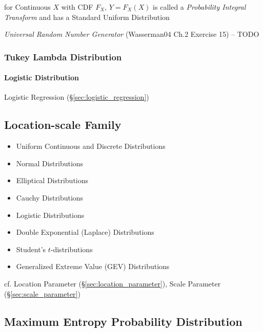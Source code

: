 for Continuous $X$ with CDF $F_X$, $Y = F_X(X)$ is called a \emph{Probability
  Integral Transform} and has a Standard Uniform Distribution

\emph{Universal Random Number Generator} (Wasserman04 Ch.2 Exercise 15) -- TODO



\subsubsection{Tukey Lambda Distribution}\label{sec:tukey_lambda_distribution}

\paragraph{Logistic Distribution}\label{sec:logistic_distribution}\hfill

\fist Logistic Regression (\S\ref{sec:logistic_regression})



\subsection{Location-scale Family}\label{sec:location_scale}

\begin{itemize}
  \item Uniform Continuous and Discrete Distributions
  \item Normal Distributions
  \item Elliptical Distributions
  \item Cauchy Distributions
  \item Logistic Distributions
  \item Double Exponential (Laplace) Distributions
  \item Student's $t$-distributions
  \item Generalized Extreme Value (GEV) Distributions
\end{itemize}


\fist cf. Location Parameter (\S\ref{sec:location_parameter}), Scale Parameter
(\S\ref{sec:scale_parameter})



\subsection{Maximum Entropy Probability Distribution}\label{sec:maximum_entropy}

